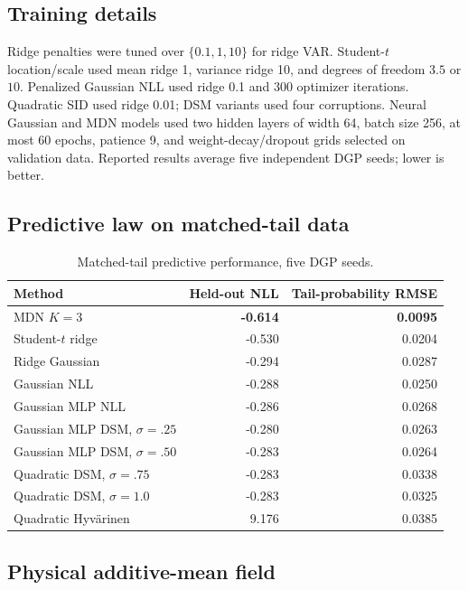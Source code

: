 \documentclass[10pt]{article}
\newcommand{\best}[1]{\ifmmode\boldsymbol{#1}\else\textbf{#1}\fi}
\begin{document}
\subsection{Training details}

Ridge penalties were tuned over $\{0.1,1,10\}$ for ridge VAR. Student-$t$ location/scale used mean ridge 1, variance ridge 10, and degrees of freedom $3.5$ or $10$. Penalized Gaussian NLL used ridge 0.1 and 300 optimizer iterations. Quadratic SID used ridge 0.01; DSM variants used four corruptions. Neural Gaussian and MDN models used two hidden layers of width 64, batch size 256, at most 60 epochs, patience 9, and weight-decay/dropout grids selected on validation data. Reported results average five independent DGP seeds; lower is better.

\subsection{Predictive law on matched-tail data}

\begin{table}[H]
\centering\small
\begin{tabularx}{0.86\linewidth}{Y rr}
\toprule
Method & Held-out NLL & Tail-probability RMSE \\
\midrule
MDN $K=3$ & \best{-0.614} & \best{0.0095} \\
Student-$t$ ridge & -0.530 & 0.0204 \\
Ridge Gaussian & -0.294 & 0.0287 \\
Gaussian NLL & -0.288 & 0.0250 \\
Gaussian MLP NLL & -0.286 & 0.0268 \\
Gaussian MLP DSM, $\sigma=.25$ & -0.280 & 0.0263 \\
Gaussian MLP DSM, $\sigma=.50$ & -0.283 & 0.0264 \\
Quadratic DSM, $\sigma=.75$ & -0.283 & 0.0338 \\
Quadratic DSM, $\sigma=1.0$ & -0.283 & 0.0325 \\
Quadratic Hyv\"arinen & 9.176 & 0.0385 \\
\bottomrule
\end{tabularx}
\caption{Matched-tail predictive performance, five DGP seeds.}
\end{table}

\subsection{Physical additive-mean field}
\end{document}

